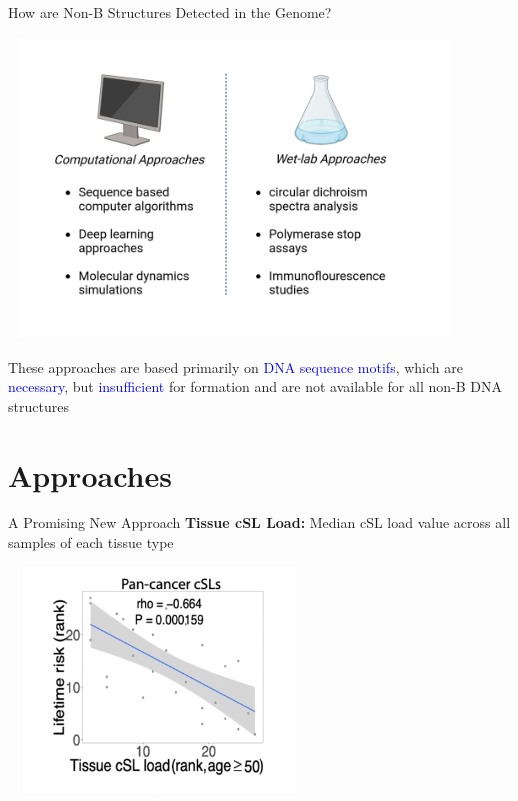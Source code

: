 \documentclass{beamer}
\begin{document}
	\begin{frame}{How are Non-B Structures Detected in the Genome?}
			\begin{center}
				\vspace{-1cm}
				\includegraphics[width=12cm, height=8cm]{Predicting_nonb_structures.png}
				\vspace{-1.5cm}
			\end{center}
		These approaches are based primarily on \textcolor{blue}{DNA sequence motifs}, which are \textcolor{blue}{necessary}, but \textcolor{blue}{insufficient} for formation and are not available for all non-B DNA structures
		
		
	\end{frame}

	\section{Approaches}

	\begin{frame}{A Promising New Approach}
		\textbf{\color{blue}Tissue cSL Load:} Median cSL load value across all samples of each tissue type
		
		\centering
		\includegraphics[width=8cm, height=6cm]{tcl1.png}
	\end{frame}
\end{document}
